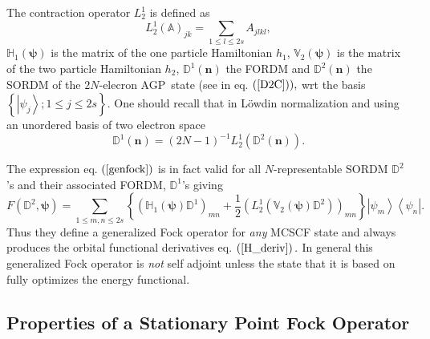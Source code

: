 \documentclass[aps,preprint]{revtex4}%
\begin{document}
The contraction operator $L_{2}^{1}$ is defined as
\begin{equation}
L_{2}^{1}\left(  \mathbb{A}\right)  _{jk}=\sum_{1\leq l\leq2s}A_{jlkl},
\end{equation}
$\mathbb{H}_{1}\left(  \bm{\psi}\right)  $ is the matrix of the one particle
Hamiltonian $h_{1}$, $\mathbb{V}_{2}\left(  \bm{\psi}\right)  $ is the matrix
of the two particle Hamiltonian $h_{2}$, $\mathbb{D}^{1}\left(  \bm{n}\right)
$ the FORDM and $\mathbb{D}^{2}\left(  \bm{n}\right)  $ the SORDM of the
$2N$-elecron AGP\ state (see in eq. $\left(  \ref{D2C}\right)  ),$ wrt the
basis $\left\{  \left\vert \psi_{j}\right\rangle ;1\leq j\leq2s\right\}  .$
One should recall that in L\"{o}wdin normalization and using an unordered
basis of two electron space
\begin{equation}
\mathbb{D}^{1}\left(  \bm{n}\right)  =\left(  2N-1\right)  ^{-1}L_{2}%
^{1}\left(  \mathbb{D}^{2}\left(  \bm{n}\right)  \right)  .
\end{equation}


The expression eq. $\left(  \ref{genfock}\right)  $ is in fact valid for all
$N$-representable SORDM $\mathbb{D}^{2}$'s and their associated FORDM,
$\mathbb{D}^{1}$'s giving
\begin{equation}
F\left(  \mathbb{D}^{2}\bm{,\psi}\right)  =\sum_{1\leq m,n\leq2s}\left\{
\left(  \mathbb{H}_{1}\left(  \bm{\psi}\right)  \mathbb{D}^{1}\right)
_{mn}+\frac{1}{2}\left(  L_{2}^{1}\left(  \mathbb{V}_{2}\left(
\bm{\psi }\right)  \mathbb{D}^{2}\right)  \right)  _{mn}\right\}  \left\vert
\psi_{m}\right\rangle \left\langle \psi_{n}\right\vert .
\end{equation}
Thus they define a generalized Fock operator for \emph{any }MCSCF state and
always produces the orbital functional derivatives eq. $\left(  \ref{H_deriv}%
\right)  .$ In general this generalized Fock operator is \emph{not }self
adjoint\emph{ }unless the state that it is based on fully optimizes the energy functional.

\subsection{Properties of a Stationary Point Fock Operator\label{Stat_Fock}}
\end{document}

